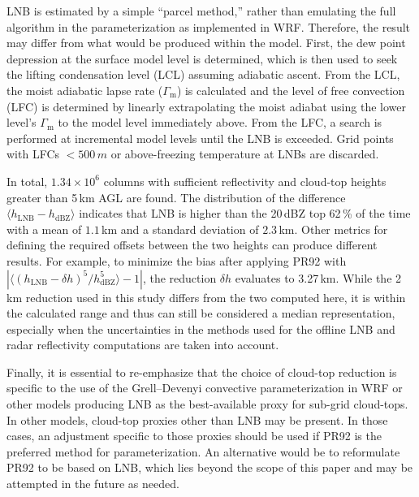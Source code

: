 LNB is estimated by a simple ``parcel method,'' rather than emulating the
full algorithm in the parameterization as implemented in WRF. Therefore, the
result may differ from what would be produced within the model. First, the
dew point depression at the surface model level is determined, which is then
used to seek the lifting condensation level (LCL) assuming adiabatic ascent.
From the LCL, the moist adiabatic lapse rate ($\Gamma_\textrm{m}$) is calculated and
the level of free convection (LFC) is determined by linearly extrapolating
the moist adiabat using the lower level's $\Gamma_\textrm{m}$ to the model level
immediately above. From the LFC, a search is performed at incremental model
levels until the LNB is exceeded. Grid points with LFCs $< 500\,\unit{m}$ or
above-freezing temperature at LNBs are discarded.

In total, $1.34\times10^6$ columns with sufficient reflectivity and cloud-top
heights greater than 5\,\unit{km} AGL are found. The distribution of the
difference $\langle h_\textrm{LNB}-h_\textrm{dBZ}\rangle$ indicates that LNB is higher than
the 20\,\unit{dBZ} top 62\,{\%} of the time with a mean of $1.1$\,\unit{km}
and a standard deviation of $2.3$\,\unit{km}. Other metrics for defining the
required offsets between the two heights can produce different results. For
example, to minimize the bias after applying PR92 with
$\left|\langle(h_\textrm{LNB}-\delta h)^5/h_\textrm{dBZ}^5\rangle-1\right|$, the reduction
$\delta h$ evaluates to 3.27\,\unit{km}. While the 2\,\unit{km} reduction
used in this study differs from the two computed here, it is within the
calculated range and thus can still be considered a median representation,
especially when the uncertainties in the methods used for the offline LNB and
radar reflectivity computations are taken into account.

Finally, it is essential to re-emphasize that the choice of cloud-top
reduction is specific to the use of the Grell--Devenyi convective
parameterization in WRF or other models producing LNB as the best-available
proxy for sub-grid cloud-tops. In other models, cloud-top proxies other than
LNB may be present. In those cases, an adjustment specific to those proxies
should be used if PR92 is the preferred method for parameterization. An
alternative would be to reformulate PR92 to be based on LNB, which lies
beyond the scope of this paper and may be attempted in the future as needed.